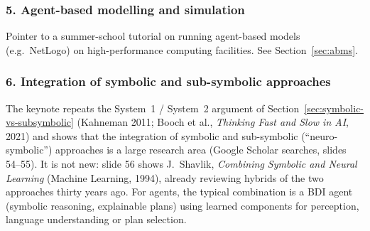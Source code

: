 \subsubsection{5. Agent-based modelling and simulation}

Pointer to a summer-school tutorial on running agent-based models (e.g.\ NetLogo) on
high-performance computing facilities. See Section~\ref{sec:abms}.

\subsubsection{6. Integration of symbolic and sub-symbolic approaches}

The keynote repeats the System~1 / System~2 argument of Section~\ref{sec:symbolic-vs-subsymbolic}
(Kahneman 2011; Booch et al., \emph{Thinking Fast and Slow in AI}, 2021) and shows that the
integration of symbolic and sub-symbolic (``neuro-symbolic'') approaches is a large research
area (Google Scholar searches, slides 54--55). It is not new: slide 56 shows J.~Shavlik,
\emph{Combining Symbolic and Neural Learning} (Machine Learning, 1994), already reviewing
hybrids of the two approaches thirty years ago. For agents, the typical combination is a BDI
agent (symbolic reasoning, explainable plans) using learned components for perception,
language understanding or plan selection.
